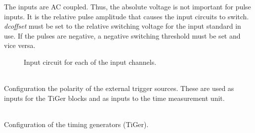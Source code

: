 			 \noindent The inputs are AC coupled. Thus, the absolute voltage is not important for pulse inputs. 
			 It is the relative pulse amplitude that causes the input circuits to switch. \textit{dc\tu offset} must be set to the relative switching voltage for the input standard in use. If the pulses are negative, a negative switching threshold must be set and vice versa.
			\begin{figure}
				\begin{center}
					\caption{Input circuit for each of the input channels. \label{fig:dcoffset1}}
				\end{center} 
			\end{figure}

			\\
			Configuration the polarity of the external trigger sources.
			These are used as inputs for the TiGer blocks and as inputs to the time measurement unit.\par

			\\
			Configuration of the timing generators (TiGer).

